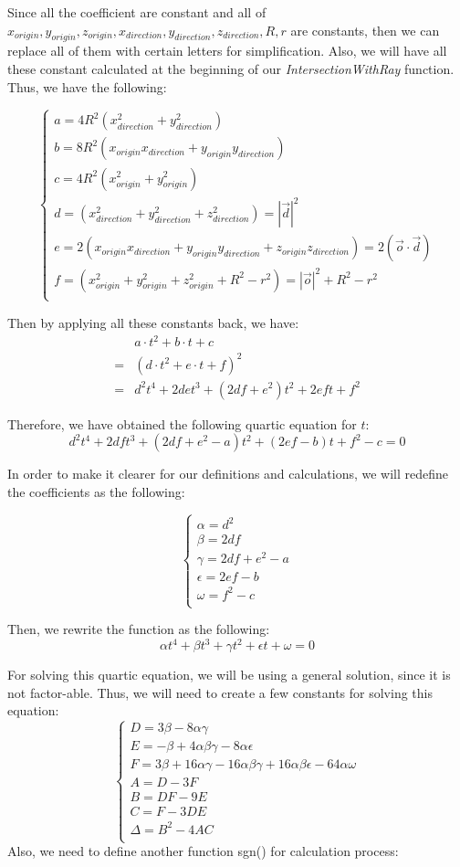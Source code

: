 \documentclass[a4paper,12pt]{report}
\begin{document}
Since all the coefficient are constant and all of $x_{origin},y_{origin},z_{origin},x_{direction},y_{direction},z_{direction},R,r$ are constants, then we can replace all of them with certain letters for simplification. Also, we will have all these constant calculated at the beginning of our \textit{IntersectionWithRay} function. Thus, we have the following:

\[\begin{cases}
a=4R^2(x_{direction}^2+y_{direction}^2)\\
b=8R^2(x_{origin}x_{direction}+y_{origin}y_{direction})\\
c=4R^2(x_{origin}^2+y_{origin}^2)\\
d=(x_{direction}^2+y_{direction}^2+z_{direction}^2)=|\overrightarrow{d}|^2\\
e=2(x_{origin}x_{direction}+y_{origin}y_{direction}+z_{origin}z_{direction})=2(\overrightarrow{o}\cdot{\overrightarrow{d}})\\
f=(x_{origin}^2+y_{origin}^2+z_{origin}^2+R^2-r^2)=|\overrightarrow{o}|^2+R^2-r^2\\
\end{cases}\]

Then by applying all these constants back, we have: 
\begin{align*}
&a\cdot{t^2}+b\cdot{t}+c\\
=&(d\cdot{t^2}+e\cdot{t}+f)^2\\
=&d^2t^4+2det^3+(2df+e^2)t^2+2eft+f^2
\end{align*}

Therefore, we have obtained the following quartic equation for $t$:
\[d^2t^4+2dft^3+(2df+e^2-a)t^2+(2ef-b)t+f^2-c=0\]

In order to make it clearer for our definitions and calculations, we will redefine the coefficients as the following:

\[\begin{cases}
\alpha=d^2\\
\beta=2df\\
\gamma=2df+e^2-a\\
\epsilon=2ef-b\\
\omega=f^2-c\\
\end{cases}\]

Then, we rewrite the function as the following:
\[\alpha t^4+\beta t^3 + \gamma t^2 + \epsilon t + \omega = 0\]

For solving this quartic equation, we will be using a general solution, since it is not factor-able. Thus, we will need to create a few constants for solving this equation:
\[\begin{cases}
D=3\beta-8\alpha \gamma\\
E=-\beta+4\alpha\beta\gamma-8\alpha\epsilon\\
F=3\beta+16\alpha\gamma-16\alpha\beta\gamma+16\alpha\beta\epsilon-64\alpha\omega\\
A=D-3F\\
B=DF-9E\\
C=F-3DE\\
\Delta = B^2-4AC\\
\end{cases}\]
Also, we need to define another function sgn() for calculation process:
\end{document}
